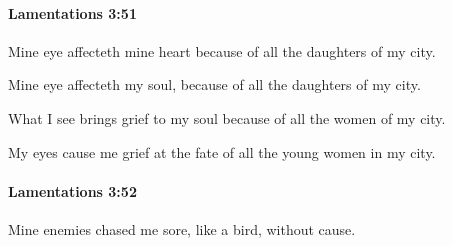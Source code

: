 		\paragraph{Lamentations 3:51} %
			\label{LAMENTATIONS-3-51}

			Mine eye affecteth mine heart because of all the daughters of my city.

			\begin{versebox}
					\item[BHS] 
					\item[LXX] 
					\item[ASV] Mine eye affecteth my soul, because of all the daughters of my city.
					\item[NIV] What I see brings grief to my soul because of all the women of my city.
					\item[NRSV] My eyes cause me grief at the fate of all the young women in my city.
			\end{versebox}

		\paragraph{Lamentations 3:52} %
			\label{LAMENTATIONS-3-52}

			Mine enemies chased me sore, like a bird, without cause.

